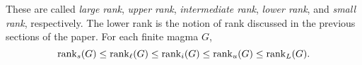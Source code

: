 These are called \emph{large rank}, \emph{upper rank}, \emph{intermediate rank}, \emph{lower rank}, and \emph{small rank}, respectively.
The lower rank is the notion of rank discussed in the previous sections of the paper.
For each finite magma $G$,
$$
    \operatorname{rank}_s(G) \leq \operatorname{rank}_\ell(G) \leq \operatorname{rank}_i(G) \leq \operatorname{rank}_u(G) \leq \operatorname{rank}_L(G).
$$





